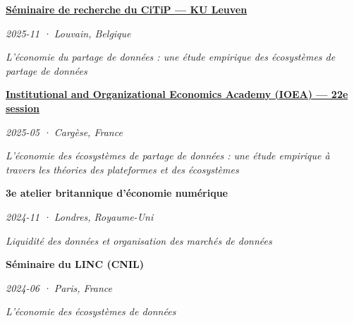 \documentclass[11pt,a4paper]{article}
\newlength{\cvindent}
\newenvironment{cvblock}[1][1]{%
  \par\noindent\hspace*{#1\cvindent}%
  \begin{minipage}{\dimexpr\linewidth-#1\cvindent\relax}%
}{%
  \end{minipage}\par
}
\newenvironment{cvdetails}{%
  \begin{list}{}{%
    \setlength{\leftmargin}{\cvindent}%
    \setlength{\rightmargin}{0pt}%
    \setlength{\topsep}{0.1em}%
    \setlength{\partopsep}{0pt}%
    \setlength{\parsep}{0.05em}%
    \setlength{\itemsep}{0pt}%
  }\item[]\small\ignorespaces
}{%
  \end{list}
}
\begin{document}
\begin{cvblock}[2]
\textbf{\href{https://www.law.kuleuven.be/citip/en/news/item/archived_news/seminar-by-lucas-eustache-the-economics-of-data-sharing-an-empirical-investigation-of-data-sharing-ecosystems}{Séminaire de recherche du CiTiP --- KU Leuven}}\par
\begin{cvdetails}
{\small\itshape 2025-11 · Louvain, Belgique}\par
\textit{L'économie du partage de données : une étude empirique des écosystèmes de partage de données}\par
\end{cvdetails}
\end{cvblock}\par\vspace{0.35em}

\begin{cvblock}[2]
\textbf{\href{https://www.ioea.eu/ioea2025/students.html}{Institutional and Organizational Economics Academy (IOEA) --- 22e session}}\par
\begin{cvdetails}
{\small\itshape 2025-05 · Cargèse, France}\par
\textit{L'économie des écosystèmes de partage de données : une étude empirique à travers les théories des plateformes et des écosystèmes}\par
\end{cvdetails}
\end{cvblock}\par\vspace{0.35em}

\begin{cvblock}[2]
\textbf{3e atelier britannique d'économie numérique}\par
\begin{cvdetails}
{\small\itshape 2024-11 · Londres, Royaume-Uni}\par
\textit{Liquidité des données et organisation des marchés de données}\par
\end{cvdetails}
\end{cvblock}\par\vspace{0.35em}

\begin{cvblock}[2]
\textbf{Séminaire du LINC (CNIL)}\par
\begin{cvdetails}
{\small\itshape 2024-06 · Paris, France}\par
\textit{L'économie des écosystèmes de données}\par
\end{cvdetails}
\end{cvblock}\par\vspace{0.35em}
\end{document}
